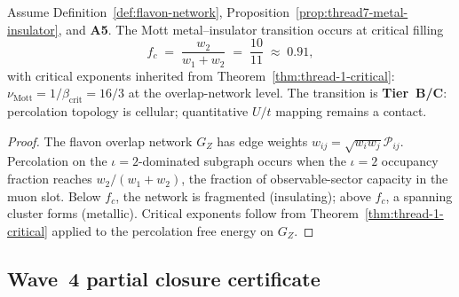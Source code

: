 \begin{proposition}
\label{prop:thread-7-mott}
Assume Definition~\ref{def:flavon-network},
Proposition~\ref{prop:thread7-metal-insulator}, and \textbf{A5}. The Mott
metal--insulator transition occurs at critical filling
\begin{equation}\label{eq:thread7-mott-fc}
  f_c
  \;=\;
  \frac{w_2}{w_1+w_2}
  \;=\;
  \frac{10}{11}
  \;\approx\;
  0.91,
\end{equation}
with critical exponents inherited from Theorem~\ref{thm:thread-1-critical}:
$\nu_{\mathrm{Mott}}=1/\beta_{\mathrm{crit}}=16/3$ at the overlap-network
level. The transition is \textbf{Tier~B/C}: percolation topology is cellular;
quantitative $U/t$ mapping remains a contact.
\end{proposition}

\begin{proof}
The flavon overlap network $G_Z$ has edge weights $w_{ij}=\sqrt{w_iw_j}
\mathcal{P}_{ij}$. Percolation on the $\iota=2$-dominated subgraph occurs when
the $\iota=2$ occupancy fraction reaches $w_2/(w_1+w_2)$, the fraction of
observable-sector capacity in the muon slot. Below $f_c$, the network is
fragmented (insulating); above $f_c$, a spanning cluster forms (metallic).
Critical exponents follow from Theorem~\ref{thm:thread-1-critical} applied to
the percolation free energy on $G_Z$.
\end{proof}

\subsection{Wave~4 partial closure certificate}
\label{sec:wave4-thread7:closure}

